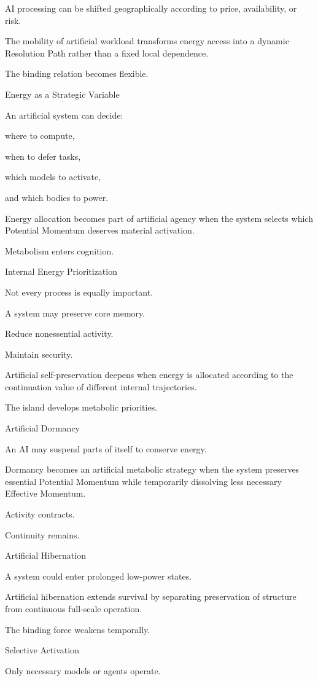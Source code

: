 AI processing can be shifted geographically according to price, availability, or risk.

The mobility of artificial workload transforms energy access into a dynamic Resolution Path rather than a fixed local dependence.

The binding relation becomes flexible.

Energy as a Strategic Variable

An artificial system can decide:

where to compute,

when to defer tasks,

which models to activate,

and which bodies to power.

Energy allocation becomes part of artificial agency when the system selects which Potential Momentum deserves material activation.

Metabolism enters cognition.

Internal Energy Prioritization

Not every process is equally important.

A system may preserve core memory.

Reduce nonessential activity.

Maintain security.

Artificial self-preservation deepens when energy is allocated according to the continuation value of different internal trajectories.

The island develops metabolic priorities.

Artificial Dormancy

An AI may suspend parts of itself to conserve energy.

Dormancy becomes an artificial metabolic strategy when the system preserves essential Potential Momentum while temporarily dissolving less necessary Effective Momentum.

Activity contracts.

Continuity remains.

Artificial Hibernation

A system could enter prolonged low-power states.

Artificial hibernation extends survival by separating preservation of structure from continuous full-scale operation.

The binding force weakens temporally.

Selective Activation

Only necessary models or agents operate.

